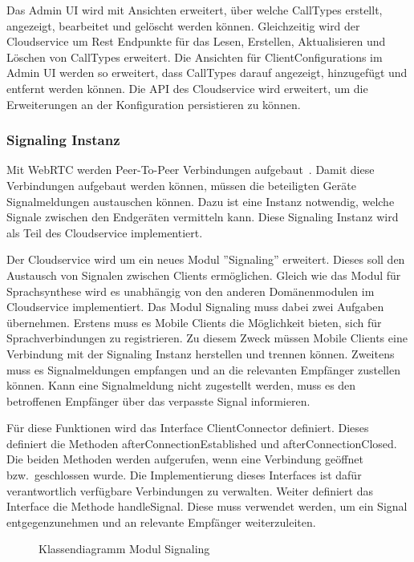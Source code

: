 Das Admin UI wird mit Ansichten erweitert, über welche CallTypes erstellt, angezeigt, bearbeitet und gelöscht werden können.
Gleichzeitig wird der Cloudservice um Rest Endpunkte für das Lesen, Erstellen, Aktualisieren und Löschen von CallTypes erweitert.
Die Ansichten für ClientConfigurations im Admin UI werden so erweitert, dass CallTypes darauf angezeigt, hinzugefügt und entfernt werden können.
Die API des Cloudservice wird erweitert, um die Erweiterungen an der Konfiguration persistieren zu können.

\clearpage

\subsubsection{Signaling Instanz}

Mit WebRTC werden Peer-To-Peer Verbindungen aufgebaut~\cite{webrtc}.
Damit diese Verbindungen aufgebaut werden können, müssen die beteiligten Geräte Signalmeldungen austauschen können.
Dazu ist eine Instanz notwendig, welche Signale zwischen den Endgeräten vermitteln kann.
Diese Signaling Instanz wird als Teil des Cloudservice implementiert.

Der Cloudservice wird um ein neues Modul ''Signaling'' erweitert.
Dieses soll den Austausch von Signalen zwischen Clients ermöglichen.
Gleich wie das Modul für Sprachsynthese wird es unabhängig von den anderen Domänenmodulen im Cloudservice implementiert.
Das Modul Signaling muss dabei zwei Aufgaben übernehmen.
Erstens muss es Mobile Clients die Möglichkeit bieten, sich für Sprachverbindungen zu registrieren.
Zu diesem Zweck müssen Mobile Clients eine Verbindung mit der Signaling Instanz herstellen und trennen können.
Zweitens muss es Signalmeldungen empfangen und an die relevanten Empfänger zustellen können.
Kann eine Signalmeldung nicht zugestellt werden, muss es den betroffenen Empfänger über das verpasste Signal informieren.

Für diese Funktionen wird das Interface ClientConnector definiert.
Dieses definiert die Methoden afterConnectionEstablished und afterConnectionClosed.
Die beiden Methoden werden aufgerufen, wenn eine Verbindung geöffnet bzw.\ geschlossen wurde.
Die Implementierung dieses Interfaces ist dafür verantwortlich verfügbare Verbindungen zu verwalten.
Weiter definiert das Interface die Methode handleSignal.
Diese muss verwendet werden, um ein Signal entgegenzunehmen und an relevante Empfänger weiterzuleiten.

\begin{figure}[h]
    \centering
    \begin{minipage}[b]{1\textwidth}
        \caption{Klassendiagramm Modul Signaling}
    \end{minipage}
\end{figure}

